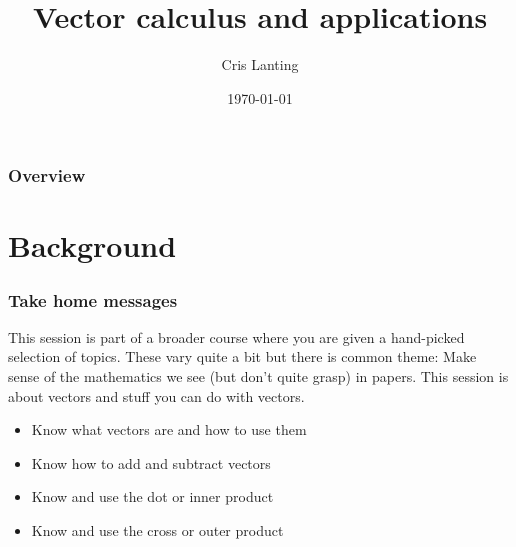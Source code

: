 \documentclass{beamer}
\title[Vectors and other useful stuf]{Vector calculus and applications} %
\author{Cris Lanting} %
\institute[UMCG] %
{
University Medical Center Groningen \\ %
Dept. of Otorhinolaryngology\\
\medskip
\textit{c.p.lanting@umcg.nl\\
https://github.com/Crisly/MathcourseBCN
} %
}
\date{\today} %
\begin{document}
\begin{frame}
\titlepage %
\end{frame}

\begin{frame}
\frametitle{Overview} %
\tableofcontents %
\end{frame}


\section{Background} %

\begin{frame}
\frametitle{Take home messages}
This session is part of a broader course where you are given a hand-picked selection of topics. These vary quite a bit but there is common theme:
Make sense of the mathematics we see (but don't quite grasp) in papers. This session is about vectors and stuff you can do with vectors.\\
\begin{itemize}
\item Know what vectors are and how to use them
\item Know how to add and subtract vectors
\item Know and use the dot or inner product
\item Know and use the cross or outer product
\end{itemize}
\end{frame}
\end{document}
